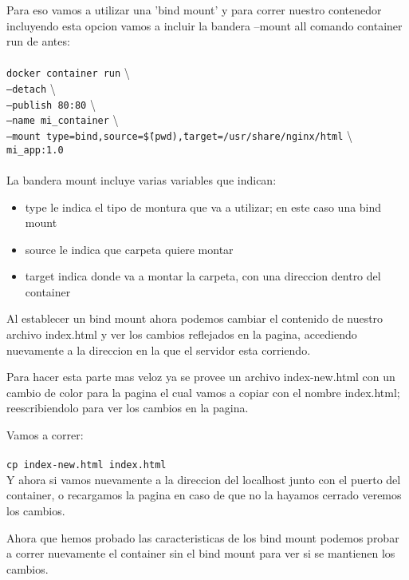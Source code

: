 \documentclass[11pt]{article} %
\begin{document}
Para eso vamos a utilizar una 'bind mount' y para correr nuestro contenedor incluyendo esta opcion vamos a incluir la bandera --mount all comando container run de antes: \\ \\
	\texttt{docker container run} \textbackslash \\
	\texttt{--detach} \textbackslash \\
	\texttt{--publish 80:80} \textbackslash \\
	\texttt{--name mi\_container} \textbackslash \\
	\texttt{--mount type=bind,source=\"\$(pwd)\",target=/usr/share/nginx/html} \textbackslash \\
	\texttt{mi\_app:1.0} \\ \\

La bandera mount incluye varias variables que indican:
\begin{itemize}
	
	\item
	type le indica el tipo de montura que va a utilizar; en este caso una bind mount

	\item	
	source le indica que carpeta quiere montar
	
	\item	
	target indica donde va a montar la carpeta, con una direccion dentro del container
\end{itemize}

Al establecer un bind mount ahora podemos cambiar el contenido de nuestro archivo index.html y ver los cambios reflejados en la pagina, accediendo nuevamente a la direccion en la que el servidor esta corriendo.

Para hacer esta parte mas veloz ya se provee un archivo index-new.html con un cambio de color para la pagina el cual vamos a copiar con el nombre index.html; reescribiendolo para ver los cambios en la pagina.

Vamos a correr: \\ \\
	\texttt{cp index-new.html index.html} \\

Y ahora si vamos nuevamente a la direccion del localhost junto con el puerto del container, o recargamos la pagina en caso de que no la hayamos cerrado veremos los cambios.

Ahora que hemos probado las caracteristicas de los bind mount podemos probar a correr nuevamente el container sin el bind mount para ver si se mantienen los cambios.
\end{document}
